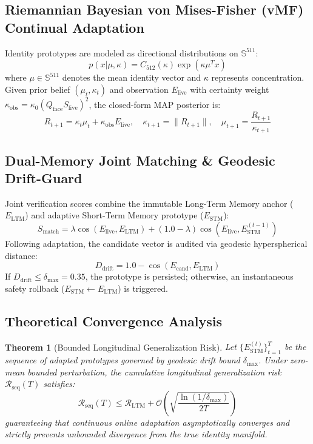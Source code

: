 \documentclass[conference]{IEEEtran}
\newtheorem{theorem}{Theorem}
\begin{document}
\subsection{Riemannian Bayesian von Mises-Fisher (vMF) Continual Adaptation}
Identity prototypes are modeled as directional distributions on $\mathbb{S}^{511}$:
\begin{equation}
p(x | \mu, \kappa) = C_{512}(\kappa) \exp\left(\kappa \mu^T x\right)
\end{equation}
where $\mu \in \mathbb{S}^{511}$ denotes the mean identity vector and $\kappa$ represents concentration. Given prior belief $(\mu_t, \kappa_t)$ and observation $E_{\text{live}}$ with certainty weight $\kappa_{\text{obs}} = \kappa_0 (Q_{\text{face}} S_{\text{live}})^2$, the closed-form MAP posterior is:
\begin{equation}
R_{t+1} = \kappa_t \mu_t + \kappa_{\text{obs}} E_{\text{live}}, \quad \kappa_{t+1} = \|R_{t+1}\|, \quad \mu_{t+1} = \frac{R_{t+1}}{\kappa_{t+1}}
\end{equation}

\subsection{Dual-Memory Joint Matching \& Geodesic Drift-Guard}
Joint verification scores combine the immutable Long-Term Memory anchor ($E_{\text{LTM}}$) and adaptive Short-Term Memory prototype ($E_{\text{STM}}$):
\begin{equation}
S_{\text{match}} = \lambda \cos(E_{\text{live}}, E_{\text{LTM}}) + (1.0 - \lambda) \cos(E_{\text{live}}, E_{\text{STM}}^{(t-1)})
\end{equation}
Following adaptation, the candidate vector is audited via geodesic hyperspherical distance:
\begin{equation}
D_{\text{drift}} = 1.0 - \cos(E_{\text{cand}}, E_{\text{LTM}})
\end{equation}
If $D_{\text{drift}} \le \delta_{\text{max}} = 0.35$, the prototype is persisted; otherwise, an instantaneous safety rollback ($E_{\text{STM}} \leftarrow E_{\text{LTM}}$) is triggered.

\subsection{Theoretical Convergence Analysis}
\begin{theorem}[Bounded Longitudinal Generalization Risk]
Let $\{E_{\text{STM}}^{(t)}\}_{t=1}^T$ be the sequence of adapted prototypes governed by geodesic drift bound $\delta_{\text{max}}$. Under zero-mean bounded perturbation, the cumulative longitudinal generalization risk $\mathcal{R}_{\text{seq}}(T)$ satisfies:
\begin{equation}
\mathcal{R}_{\text{seq}}(T) \le \mathcal{R}_{\text{LTM}} + \mathcal{O}\left(\sqrt{\frac{\ln(1/\delta_{\text{max}})}{2T}}\right)
\end{equation}
guaranteeing that continuous online adaptation asymptotically converges and strictly prevents unbounded divergence from the true identity manifold.
\end{theorem}
\end{document}

